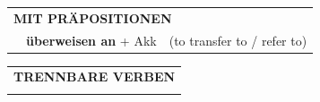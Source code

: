 \documentclass[10pt,a4paper]{revtex4-2}
\begin{document}
\begin{verbbox}
\vspace{10pt}

\begin{tabular}{lll}
\multicolumn{3}{l}{\textbf{MIT PRÄPOSITIONEN}}\\
& \textbf{überweisen an} + Akk & (to transfer to / refer to)\\
\end{tabular}
\hfill
\begin{tabular}{lll}
\multicolumn{3}{l}{\textbf{TRENNBARE VERBEN}}\\
\vspace{10pt}\\
\end{tabular}
\vspace{-5pt}
\end{verbbox}

\end{document}
